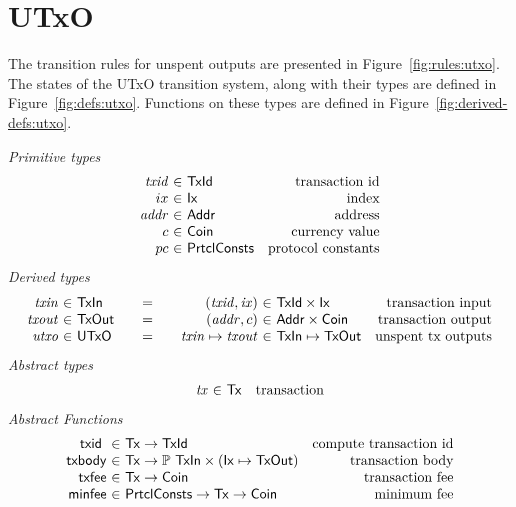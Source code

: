 \section{UTxO}
\label{sec:state-trans-utxo-1}

The transition rules for unspent outputs are presented in
Figure~\ref{fig:rules:utxo}. The states of the UTxO transition system,
along with their types are defined in Figure~\ref{fig:defs:utxo}.
Functions on these types are defined in Figure~\ref{fig:derived-defs:utxo}.

\begin{figure*}[htb]
  \emph{Primitive types}
  \begin{equation*}
    \begin{array}{r@{~\in~}lr}
      \var{txid} & \TxId & \text{transaction id}\\
      ix & \Ix & \text{index}\\
      \var{addr} & \Addr & \text{address}\\
      c & \Coin & \text{currency value}\\
      pc & \PrtclConsts & \text{protocol constants}
    \end{array}
  \end{equation*}
  \emph{Derived types}
  \begin{equation*}
    \begin{array}{r@{~\in~}l@{\qquad=\qquad}r@{~\in~}lr}
      \var{txin}
      & \TxIn
      & (\var{txid}, \var{ix})
      & \TxId \times \Ix
      & \text{transaction input}
      \\
      \var{txout}
      & \type{TxOut}
      & (\var{addr}, c)
      & \Addr \times \Coin
      & \text{transaction output}
      \\
      \var{utxo}
      & \UTxO
      & \var{txin} \mapsto \var{txout}
      & \TxIn \mapsto \TxOut
      & \text{unspent tx outputs}
    \end{array}
  \end{equation*}
  \emph{Abstract types}
  \begin{equation*}
    \begin{array}{r@{~\in~}lr}
      \var{tx} & \Tx & \text{transaction}\\
    \end{array}
  \end{equation*}
  \emph{Abstract Functions}
  \begin{equation*}
    \begin{array}{r@{~\in~}lr}
      \txid{} & \Tx \to \TxId & \text{compute transaction id}\\
      \fun{txbody} & \Tx \to \powerset{\TxIn} \times (\Ix \mapsto \TxOut)
                                  & \text{transaction body}\\
      \fun{txfee} & \Tx \to \Coin & \text{transaction fee}\\
      \fun{minfee} & \PrtclConsts \to \Tx \to \Coin & \text{minimum fee}
    \end{array}
  \end{equation*}
  \caption{Definitions used in the UTxO transition system}
  \label{fig:defs:utxo}
\end{figure*}

